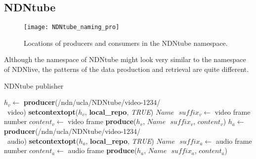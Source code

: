 \subsection{NDNtube}
\begin{figure*}[ht]
  \centering
  \texttt{[image: NDNtube\_naming\_pro]}
  \caption{Locations of producers and consumers in the NDNtube namespace.}
  \label{fig:NDNtube_cp}
\end{figure*}
Although the namespace of NDNtube might look very similar to the namespace of NDNlive, the patterns of the data production and retrieval are quite different. 

\begin{algorithm}[ht]
\caption{NDNtube publisher}
\label{alg:recordproducer}
\begin{algorithmic}[3]
\State $h_v \leftarrow $ \textbf{producer}(/ndn/ucla/NDNtube/video-1234/ \\\ video)
\State \textbf{setcontextopt}($h_v$, \textbf{local\_repo}, \textit{TRUE})
\vspace{0.2cm}
	\State $Name \textbf{ } suffix_v \leftarrow $ video frame number
	\State $content_v \leftarrow $ video frame
	\State \textbf{produce}($h_v$, $Name\textbf{ }suffix_v$, $content_v$)
	\EndWhile
\vspace{0.2cm}
\vspace{0.2cm}
\State $h_a \leftarrow $ \textbf{producer}(/ndn/ucla/NDNtube/video-1234/ \\\ audio)
\State \textbf{setcontextopt}($h_a$, \textbf{local\_repo}, \textit{TRUE})
\vspace{0.2cm}
	\State $Name \textbf{ } suffix_a \leftarrow $ audio frame number
	\State $content_a \leftarrow $ audio frame
	\State \textbf{produce}($h_a$, $Name\textbf{ }suffix_a$, $content_a$)
	\EndWhile
\end{algorithmic}
\end{algorithm}

